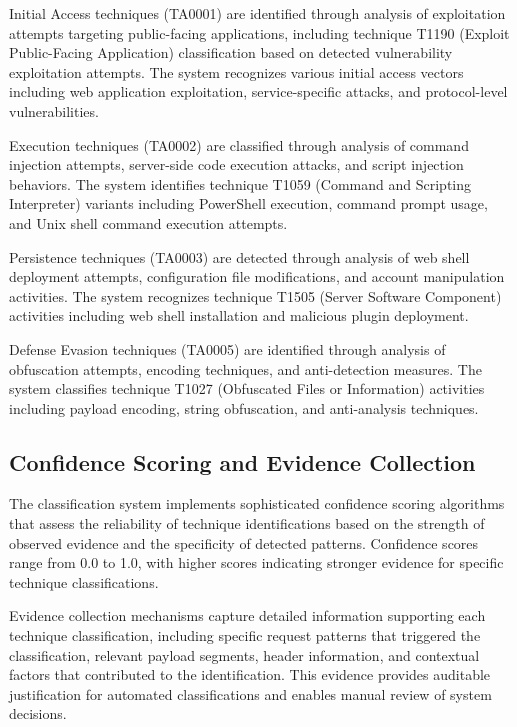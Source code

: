 Initial Access techniques (TA0001) are identified through analysis of exploitation attempts targeting public-facing applications, including technique T1190 (Exploit Public-Facing Application) classification based on detected vulnerability exploitation attempts. The system recognizes various initial access vectors including web application exploitation, service-specific attacks, and protocol-level vulnerabilities.

Execution techniques (TA0002) are classified through analysis of command injection attempts, server-side code execution attacks, and script injection behaviors. The system identifies technique T1059 (Command and Scripting Interpreter) variants including PowerShell execution, command prompt usage, and Unix shell command execution attempts.

Persistence techniques (TA0003) are detected through analysis of web shell deployment attempts, configuration file modifications, and account manipulation activities. The system recognizes technique T1505 (Server Software Component) activities including web shell installation and malicious plugin deployment.

Defense Evasion techniques (TA0005) are identified through analysis of obfuscation attempts, encoding techniques, and anti-detection measures. The system classifies technique T1027 (Obfuscated Files or Information) activities including payload encoding, string obfuscation, and anti-analysis techniques.

\subsection{Confidence Scoring and Evidence Collection}

The classification system implements sophisticated confidence scoring algorithms that assess the reliability of technique identifications based on the strength of observed evidence and the specificity of detected patterns. Confidence scores range from 0.0 to 1.0, with higher scores indicating stronger evidence for specific technique classifications.

Evidence collection mechanisms capture detailed information supporting each technique classification, including specific request patterns that triggered the classification, relevant payload segments, header information, and contextual factors that contributed to the identification. This evidence provides auditable justification for automated classifications and enables manual review of system decisions.


